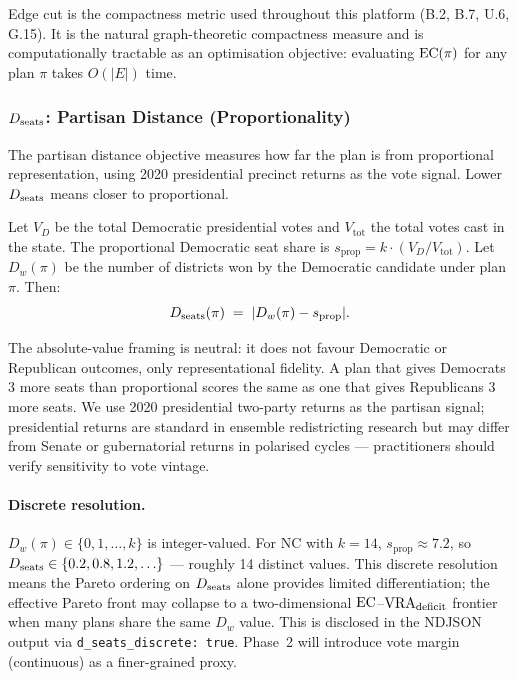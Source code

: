 Edge cut is the compactness metric used throughout this platform (B.2, B.7,
U.6, G.15).
It is the natural graph-theoretic compactness measure and is computationally
tractable as an optimisation objective: evaluating $\mathrm{EC}(\pi)$ for any plan
$\pi$ takes $O(|E|)$ time.

\subsubsection{$D_{\mathrm{seats}}$: Partisan Distance (Proportionality)}

The partisan distance objective measures how far the plan is from proportional
representation, using 2020 presidential precinct returns as the vote signal.
Lower $D_{\mathrm{seats}}$ means closer to proportional.

\begin{definition}
\label{def:dseats}
Let $V_D$ be the total Democratic presidential votes and $V_{\mathrm{tot}}$
the total votes cast in the state.
The proportional Democratic seat share is
$s_{\mathrm{prop}} = k \cdot (V_D / V_{\mathrm{tot}})$.
Let $D_w(\pi)$ be the number of districts won by the Democratic candidate
under plan $\pi$.
Then:
\[
  D_{\mathrm{seats}}(\pi) \;=\; |D_w(\pi) - s_{\mathrm{prop}}|.
\]
\end{definition}

The absolute-value framing is neutral: it does not favour Democratic or
Republican outcomes, only representational fidelity.
A plan that gives Democrats 3 more seats than proportional scores the same as
one that gives Republicans 3 more seats.
We use 2020 presidential two-party returns as the partisan signal; presidential returns are standard in ensemble redistricting research \citep{deford2021} but may differ from Senate or gubernatorial returns in polarised cycles --- practitioners should verify sensitivity to vote vintage.

\paragraph{Discrete resolution.}
$D_w(\pi) \in \{0, 1, \ldots, k\}$ is integer-valued.
For NC with $k=14$, $s_{\mathrm{prop}} \approx 7.2$, so
$D_{\mathrm{seats}} \in \{0.2, 0.8, 1.2, \ldots\}$ --- roughly 14 distinct values.
This discrete resolution means the Pareto ordering on $D_{\mathrm{seats}}$ alone
provides limited differentiation; the effective Pareto front may collapse
to a two-dimensional $\mathrm{EC}$--$\mathrm{VRA}_{\mathrm{deficit}}$ frontier when many plans share the same
$D_w$ value.
This is disclosed in the NDJSON output via \texttt{d\_seats\_discrete: true}.
Phase~2 will introduce vote margin (continuous) as a finer-grained proxy.

